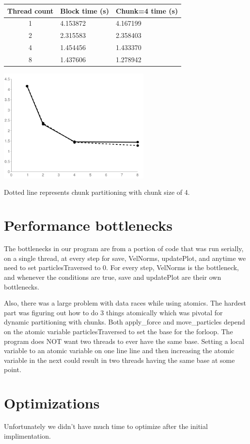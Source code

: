 \documentclass{article}[12pt;letterpaper]
\begin{document}
\begin{center}
\begin{tabular}{c l l}
Thread count & Block time (s) & Chunk=4 time (s) \\
\hline{}
1 & 4.153872 & 4.167199 \\
2 & 2.315583 & 2.358403 \\
4 & 1.454456 & 1.433370 \\
8 & 1.437606 & 1.278942
\end{tabular}

\includegraphics[width=3in]{a2_sec3_1.png}
\end{center}

Dotted line represents chunk partitioning with chunk size of 4.

\section{Performance bottlenecks}

The bottlenecks in our program are from a portion of code that was run serially, on a 
single thread, at every step for save, VelNorms, updatePlot, and anytime we need to 
set particlesTraversed to 0. For every step, VelNorms is the bottleneck, and whenever
the conditions are true, save and updatePlot are their own bottlenecks.

Also, there was a large problem with data races while using atomics. The hardest part
was figuring out how to do 3 things atomically which was pivotal for dynamic 
partitioning with chunks. Both apply_force and move_particles depend on the atomic
variable particlesTraversed to set the base for the forloop. The program does NOT
want two threads to ever have the same base. Setting a local variable to an atomic 
variable on one line line and then increasing the atomic variable in the next could 
result in two threads having the same base at some point.

\section{Optimizations}

Unfortunately we didn't have much time to optimize after the initial implimentation.
\end{document}
